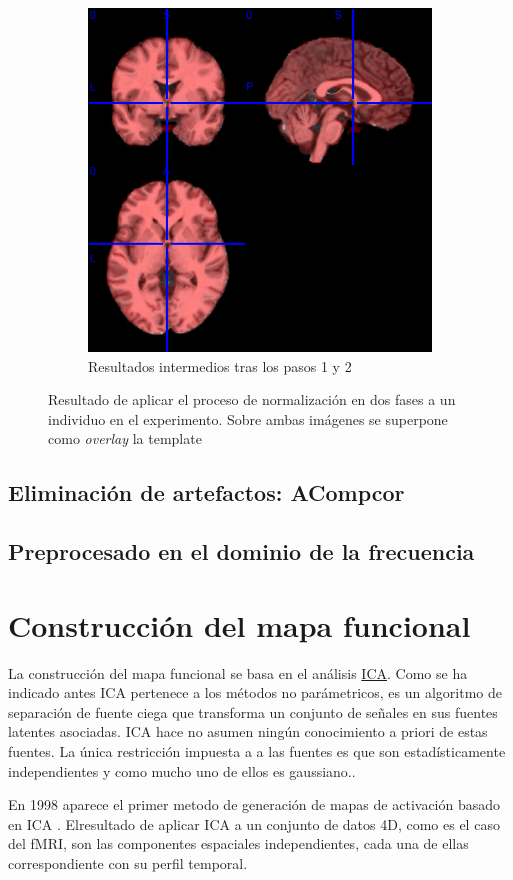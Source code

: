 \begin{figure}[H]
\begin{subfigure}{\linewidth}
  \includegraphics[width=.5\linewidth]{img/preproc/highres2template.png}\hfill
  \caption{Resultados intermedios tras los pasos 1 y 2}
  \end{subfigure}\par\medskip
  \caption{Resultado de aplicar el proceso de normalización en dos fases a un individuo en el experimento. Sobre ambas imágenes se superpone como \textit{overlay} la template}
  \label{preproc:ants}
\end{figure}

\subsection{Eliminación de artefactos: ACompcor}

\subsection{Preprocesado en el dominio de la frecuencia}

\section{Construcción del mapa funcional}

La construcción del mapa funcional se basa en el análisis \hyperref[glos:ica]{ICA}. Como se ha indicado antes ICA pertenece a los métodos no parámetricos, es un algoritmo de separación de fuente ciega que transforma un conjunto de señales en sus fuentes latentes asociadas. ICA hace no asumen ningún conocimiento a priori de estas fuentes. La única restricción impuesta a a las fuentes es que son estadísticamente independientes y como mucho uno de ellos es gaussiano.\cite{ica}.

En 1998 aparece el primer metodo de generación de mapas de activación basado en ICA \cite{fmriica}. Elresultado de aplicar ICA a un conjunto de datos 4D, como es el caso del fMRI, son las componentes espaciales independientes, cada una de ellas correspondiente con su perfil temporal.


